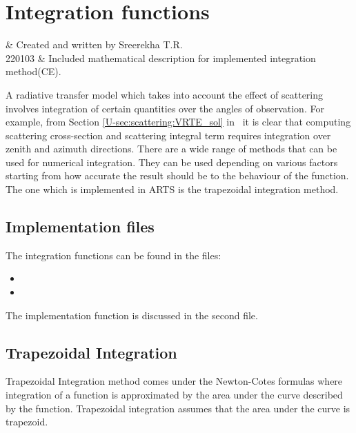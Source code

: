 \chapter{Integration functions}
\label{sec:integration}

 & Created and written by Sreerekha T.R.\\
  220103 & Included mathematical description for implemented integration method(CE).\\
\stophistory

%
%
A radiative transfer model which takes into account the effect of
scattering involves integration of certain quantities over the angles
of observation.  For example, from Section
\ref{U-sec:scattering:VRTE_sol} in \user\ it is clear that computing
scattering cross-section and scattering integral term requires
integration over zenith and azimuth directions. There are a wide range
of methods that can be used for numerical integration. They can be
used depending on various factors starting from how accurate the
result should be to the behaviour of the function. The one which is
implemented in ARTS is the trapezoidal integration method.


\section{Implementation files}
\label{sec:integration:files}

The integration functions can be found in the files:
\begin{itemize}
\item {}
\item {}
\end{itemize}
The implementation function is
discussed in the second file. 

\section{Trapezoidal Integration}
\label{sec:integration:trapezoidal}

Trapezoidal Integration method comes under the Newton-Cotes formulas
where integration of a function is approximated by the area under the
curve described by the function.  Trapezoidal integration assumes that
the area under the curve is trapezoid.  

